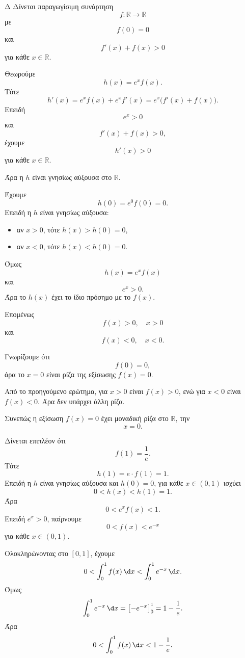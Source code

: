 \begin{thema}{Δ}
Δίνεται παραγωγίσιμη συνάρτηση
\[
f:\mathbb{R}\to\mathbb{R}
\]
με
\[
f(0)=0
\]
και
\[
f'(x)+f(x)>0
\]
για κάθε $x\in\mathbb{R}$.
\begin{erwthma}
\item Θεωρούμε
\[
h(x)=e^x f(x).
\]
Τότε
\[
h'(x)=e^x f(x)+e^x f'(x)
=e^x\bigl(f'(x)+f(x)\bigr).
\]
Επειδή
\[
e^x>0
\]
και
\[
f'(x)+f(x)>0,
\]
έχουμε
\[
{h'(x)>0}
\]
για κάθε $x\in\mathbb{R}$.

Άρα η $h$ είναι γνησίως αύξουσα στο $\mathbb{R}$.

\item Έχουμε
\[
h(0)=e^0f(0)=0.
\]
Επειδή η $h$ είναι γνησίως αύξουσα:
\begin{itemize}
\item αν $x>0$, τότε $h(x)>h(0)=0$,
\item αν $x<0$, τότε $h(x)<h(0)=0$.
\end{itemize}
Όμως
\[
h(x)=e^x f(x)
\]
και
\[
e^x>0.
\]
Άρα το $h(x)$ έχει το ίδιο πρόσημο με το $f(x)$.

Επομένως
\[
{f(x)>0,\quad x>0}
\]
και
\[
{f(x)<0,\quad x<0}.
\]

\item Γνωρίζουμε ότι
\[
f(0)=0,
\]
άρα το $x=0$ είναι ρίζα της εξίσωσης $f(x)=0$.

Από το προηγούμενο ερώτημα, για $x>0$ είναι $f(x)>0$, ενώ για $x<0$ είναι $f(x)<0$. Άρα δεν υπάρχει άλλη ρίζα.

Συνεπώς η εξίσωση $f(x)=0$ έχει μοναδική ρίζα στο $\mathbb{R}$, την
\[
{x=0}.
\]

\item Δίνεται επιπλέον ότι
\[
f(1)=\frac1e.
\]
Τότε
\[
h(1)=e\cdot f(1)=1.
\]
Επειδή η $h$ είναι γνησίως αύξουσα και $h(0)=0$, για κάθε $x\in(0,1)$ ισχύει
\[
0<h(x)<h(1)=1.
\]
Άρα
\[
0<e^x f(x)<1.
\]
Επειδή $e^x>0$, παίρνουμε
\[
0<f(x)<e^{-x}
\]
για κάθε $x\in(0,1)$.

Ολοκληρώνοντας στο $[0,1]$, έχουμε
\[
0<\dint_0^1 f(x)\,\d x<\dint_0^1 e^{-x}\,\d x.
\]
Όμως
\[
\dint_0^1 e^{-x}\,\d x
=\left[-e^{-x}\right]_0^1
=1-\frac1e.
\]
Άρα
\[
{0<\dint_0^1 f(x)\,\d x<1-\frac1e}.
\]
\end{erwthma}
\end{thema}
